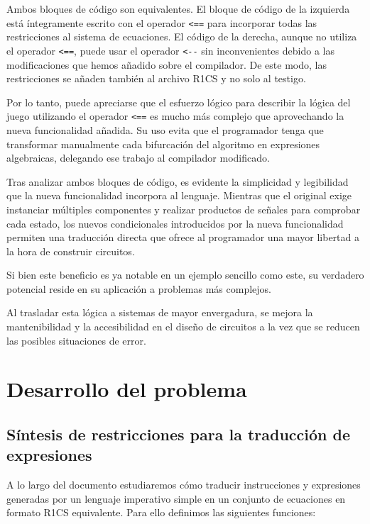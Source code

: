 \documentclass[a4paper,12pt]{report}
\begin{document}
	
	\vspace{0.2cm}
	\noindent Ambos bloques de código son equivalentes. El bloque de código de la izquierda está íntegramente escrito con el operador \texttt{<==} para incorporar todas las restricciones al sistema de ecuaciones. El código de la derecha, aunque no utiliza el operador \texttt{<==}, puede usar el operador \texttt{<-}\texttt{-} sin inconvenientes debido a las modificaciones que hemos añadido sobre el compilador. De este modo, las restricciones se añaden también al archivo R1CS y no solo al testigo.
	
	\vspace{0.2cm}
	\noindent Por lo tanto, puede apreciarse que el esfuerzo lógico para describir la lógica del juego utilizando el operador \texttt{<==} es mucho más complejo que aprovechando la nueva funcionalidad añadida. Su uso evita que el programador tenga que transformar manualmente cada bifurcación del algoritmo en expresiones algebraicas, delegando ese trabajo al compilador modificado.
	
	\vspace{0.2cm}
	\noindent Tras analizar ambos bloques de código, es evidente la simplicidad y legibilidad que la nueva funcionalidad incorpora al lenguaje. Mientras que el original exige instanciar múltiples componentes y realizar productos de señales para comprobar cada estado, los nuevos condicionales introducidos por la nueva funcionalidad permiten una traducción directa que ofrece al programador una mayor libertad a la hora de construir circuitos.
	
	\vspace{0.2cm}
	\noindent Si bien este beneficio es ya notable en un ejemplo sencillo como este, su verdadero potencial reside en su aplicación a problemas más complejos.
	
	\vspace{0.2cm}
	\noindent Al trasladar esta lógica a sistemas de mayor envergadura, se mejora la mantenibilidad y la accesibilidad en el diseño de circuitos a la vez que se reducen las posibles situaciones de error.
	
	\chapter{Desarrollo del problema}
	
	\section{Síntesis de restricciones para la traducción de expresiones}
	\noindent A lo largo del documento estudiaremos cómo traducir instrucciones y expresiones generadas por un lenguaje imperativo simple en un conjunto de ecuaciones en formato R1CS equivalente. Para ello definimos las siguientes funciones: 
	
\end{document}

